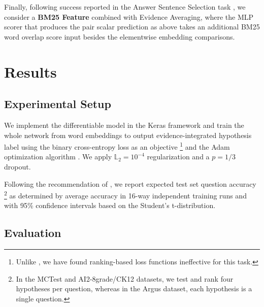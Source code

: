 \documentclass[11pt]{article}
\begin{document}
Finally, following success reported in the Answer Sentence Selection task \cite{sps},
we consider a \textbf{BM25 Feature} combined with Evidence Averaging,
where the MLP scorer that produces the pair scalar prediction as above takes
an additional BM25 word overlap score input \cite{BM25} besides the elementwise
embedding comparisons.

\section{Results}
\label{sec:res}

\subsection{Experimental Setup}

We implement the differentiable model in the Keras framework \cite{Keras} and
train the whole network from word embeddings to output evidence-integrated
hypothesis label using the binary cross-entropy loss as an objective%
\footnote{Unlike \cite{HABCNN}, we have found ranking-based loss functions
	ineffective for this task.}
and the Adam optimization algorithm \cite{Adam}.  We apply $\mathbb{L}_2 = 10^{-4}$
regularization and a $p=1/3$ dropout.

Following the recommendation of \cite{sps}, we report expected test set
question accuracy%
\footnote{In the MCTest and AI2-8grade/CK12 datasets, we test and rank four
	hypotheses per question, whereas in the Argus dataset, each
	hypothesis is a single question.}
as determined by average accuracy in 16-way independent training runs
and with 95\% confidence intervals based on the Student's
t-distribution.

\subsection{Evaluation}
\end{document}
